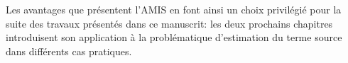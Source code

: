 Les avantages que présentent l'AMIS en font ainsi un choix privilégié pour la suite des travaux présentés dans ce manuscrit: les deux prochains chapitres introduisent son application à la problématique d'estimation du terme source dans différents cas pratiques.
%
%
%
%
%
%
%
%
%
